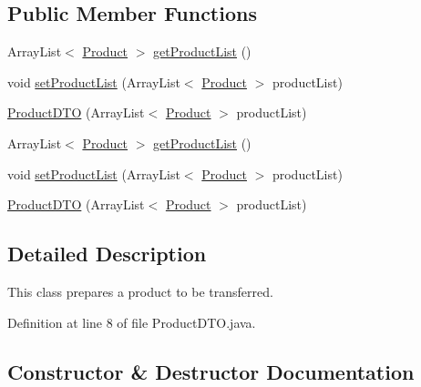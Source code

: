 \subsection*{Public Member Functions}
\begin{DoxyCompactItemize}
\item 
Array\+List$<$ \mbox{\hyperlink{class_s_p_q_1_1data_1_1_product}{Product}} $>$ \mbox{\hyperlink{class_s_p_q_1_1dto_1_1_product_d_t_o_a4b7df5983f4342285d495a335fb9019f}{get\+Product\+List}} ()
\item 
void \mbox{\hyperlink{class_s_p_q_1_1dto_1_1_product_d_t_o_a79be4bcc432ec5c17c5873e868aa2e4f}{set\+Product\+List}} (Array\+List$<$ \mbox{\hyperlink{class_s_p_q_1_1data_1_1_product}{Product}} $>$ product\+List)
\item 
\mbox{\hyperlink{class_s_p_q_1_1dto_1_1_product_d_t_o_a206290d64e728a8838485f958bee2c29}{Product\+D\+TO}} (Array\+List$<$ \mbox{\hyperlink{class_s_p_q_1_1data_1_1_product}{Product}} $>$ product\+List)
\item 
Array\+List$<$ \mbox{\hyperlink{class_s_p_q_1_1data_1_1_product}{Product}} $>$ \mbox{\hyperlink{class_s_p_q_1_1dto_1_1_product_d_t_o_a4b7df5983f4342285d495a335fb9019f}{get\+Product\+List}} ()
\item 
void \mbox{\hyperlink{class_s_p_q_1_1dto_1_1_product_d_t_o_a79be4bcc432ec5c17c5873e868aa2e4f}{set\+Product\+List}} (Array\+List$<$ \mbox{\hyperlink{class_s_p_q_1_1data_1_1_product}{Product}} $>$ product\+List)
\item 
\mbox{\hyperlink{class_s_p_q_1_1dto_1_1_product_d_t_o_a206290d64e728a8838485f958bee2c29}{Product\+D\+TO}} (Array\+List$<$ \mbox{\hyperlink{class_s_p_q_1_1data_1_1_product}{Product}} $>$ product\+List)
\end{DoxyCompactItemize}


\subsection{Detailed Description}
This class prepares a product to be transferred. 

Definition at line 8 of file Product\+D\+T\+O.\+java.



\subsection{Constructor \& Destructor Documentation}
\mbox{\label{class_s_p_q_1_1dto_1_1_product_d_t_o_a206290d64e728a8838485f958bee2c29}} 

